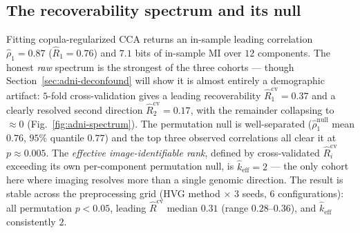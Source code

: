 \documentclass{article}
\begin{document}
\subsection{The recoverability spectrum and its null}
\label{sec:adni-spectrum}
Fitting copula-regularized CCA returns an in-sample leading correlation
$\hat\rho_1 = 0.87$ ($\hat R_1 = 0.76$) and $7.1$ bits of in-sample MI over $12$
components. The honest \emph{raw} spectrum is the strongest of the three
cohorts --- though Section~\ref{sec:adni-deconfound} will show it is almost
entirely a demographic artifact:
$5$-fold cross-validation gives a leading recoverability
$\hat R_1^{\mathrm{cv}} = 0.37$ and a clearly resolved second direction
$\hat R_2^{\mathrm{cv}} = 0.17$, with the remainder collapsing to $\approx 0$
(Fig.~\ref{fig:adni-spectrum}). The permutation null is well-separated
($\hat\rho_1^{\mathrm{null}}$ mean $0.76$, $95\%$ quantile $0.77$) and the top
three observed correlations all clear it at $p \approx 0.005$. The
\emph{effective image-identifiable rank}, defined by cross-validated $\hat
R_i^{\mathrm{cv}}$ exceeding its own per-component permutation null, is
$\hat k_{\mathrm{eff}} = 2$ --- the only cohort here where imaging resolves more
than a single genomic direction. The result is stable across the preprocessing
grid (HVG method $\times$ $3$ seeds, $6$ configurations): all permutation
$p < 0.05$, leading $\hat R^{\mathrm{cv}}$ median $0.31$ (range $0.28$--$0.36$),
and $\hat k_{\mathrm{eff}}$ consistently $2$.
\end{document}
